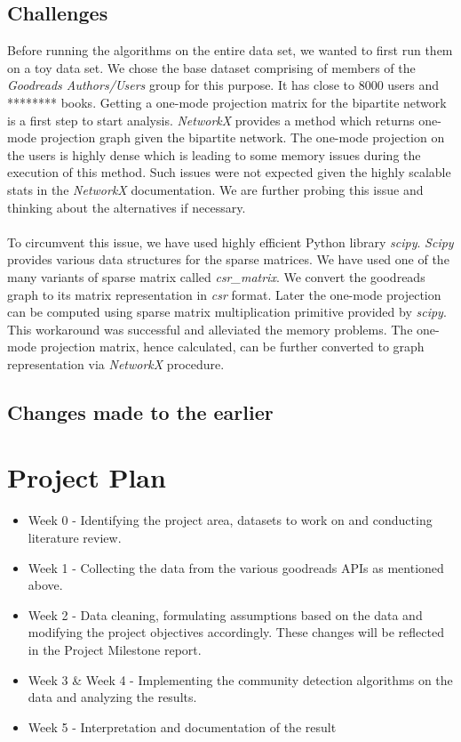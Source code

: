 \documentclass[11pt]{article}
\begin{document}
\subsection{Challenges}
Before running the algorithms on the entire data set, we wanted to first run them on a toy data set. We chose the  base dataset comprising of members of the {\it Goodreads Authors/Users} group for this purpose. It has close to 8000 users and {********} books. Getting a one-mode projection matrix for the bipartite network is a first step to start analysis. {\it NetworkX} provides a method which returns one-mode projection graph given the bipartite network. The one-mode projection on the users is highly dense which is leading to some memory issues during the execution of this method. Such issues were not expected given the highly  scalable stats in the {\it NetworkX} documentation. We are further probing this issue and thinking about the alternatives if necessary. \\\\
To circumvent this issue, we have used highly efficient Python library {\it scipy}. {\it Scipy} provides various data structures for the sparse matrices. We have used one of the many variants of sparse matrix called {\it csr\_matrix}. We convert the goodreads graph to its matrix representation in {\it csr} format. Later the one-mode projection can be computed using sparse matrix multiplication primitive provided by {\it scipy}. This workaround was successful and alleviated the memory problems. The one-mode projection matrix, hence calculated, can be further converted to graph representation via {\it NetworkX} procedure.
\subsection{Changes made to the earlier}
\section{Project Plan}
\begin{itemize}
\item Week 0 - Identifying the project area, datasets to work on and conducting literature review. \checkmark
\item Week 1 -  Collecting the data from the various goodreads APIs as mentioned above. \checkmark
\item Week 2 -  Data cleaning, formulating assumptions based on the data and modifying the project objectives accordingly. These changes will be reflected in the Project Milestone report. \checkmark
\item Week 3 \& Week 4 - Implementing the community detection algorithms on the data and analyzing the results.
\item Week 5 - Interpretation and documentation of the result
\end{itemize}



\end{document}
